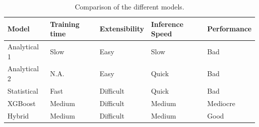 \begin{table}[ht]
    \centering
    \begin{tabular}{lllll}
        \toprule
        Model        & Training time & Extensibility & Inference Speed & Performance \\
        \midrule
        Analytical 1 & Slow          & Easy          & Slow            & Bad         \\
        Analytical 2 & N.A.          & Easy          & Quick           & Bad         \\
        Statistical  & Fast          & Difficult     & Quick           & Bad         \\
        XGBoost      & Medium        & Difficult     & Medium          & Mediocre    \\
        Hybrid       & Medium        & Difficult     & Medium          & Good        \\
        \bottomrule
    \end{tabular}
    \caption{Comparison of the different models.}
\end{table}



